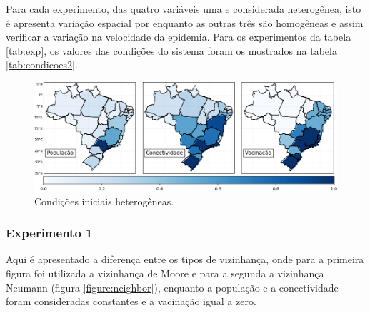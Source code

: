 \documentclass[a4paper,12pt]{article}
\begin{document}
Para cada experimento, das quatro variáveis uma e considerada heterogênea, isto é apresenta variação espacial por enquanto as outras três são homogêneas e assim verificar a variação na velocidade da epidemia. Para os experimentos da tabela \ref{tab:exp}, os valores das condições do sistema foram os mostrados na tabela \ref{tab:condicoes2}.

\begin{figure}[!ht]
 \begin{center}
  \includegraphics[width=1\linewidth]{fig/variaveis_espaciais.png}
 \end{center}
 \caption{Condições iniciais heterogêneas.}
\label{figure:CI}
\end{figure}

\newpage
\subsubsection{Experimento 1}
Aqui é apresentado a diferença entre os tipos de vizinhança, onde para a primeira figura foi utilizada a vizinhança de Moore e para a segunda a vizinhança Neumann (figura \ref{figure:neighbor}), enquanto a população e a conectividade foram consideradas constantes e a vacinação igual a zero.
\end{document}
